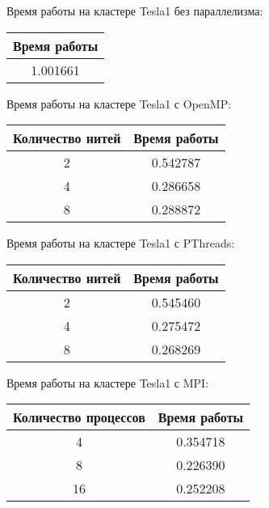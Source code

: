 \documentclass[12pt]{article}
\begin{document}
\bigskip
\bigskip
\bigskip

Время работы на кластере Tesla1 без параллелизма:
\begin{center}
    \begin{tabular}{c}
      \hline
      Время работы  \\
      \hline
      1.001661 \\
      \hline
    \end{tabular}
\end{center}

Время работы на кластере Tesla1 с OpenMP:
\begin{center}
    \begin{tabular}{c|c}
     \hline
      Количество нитей & Время работы  \\
      \hline
      2 & 0.542787 \\
      \hline
      4 & 0.286658 \\
      \hline
      8 &  0.288872 \\
      \hline
    \end{tabular}
\end{center}

\newpage

Время работы на кластере Tesla1 с PThreads:
\begin{center}
    \begin{tabular}{c|c}
     \hline
      Количество нитей & Время работы  \\
      \hline
      2 & 0.545460 \\
      \hline
      4 & 0.275472 \\
      \hline
      8 &  0.268269 \\
      \hline
    \end{tabular}
\end{center}

Время работы на кластере Tesla1 с MPI:
\begin{center}
    \begin{tabular}{c|c}
     \hline
      Количество процессов & Время работы  \\
      \hline
      4 & 0.354718 \\
      \hline
      8 & 0.226390 \\
      \hline
      16 &  0.252208 \\
      \hline
    \end{tabular}
\end{center}
\end{document}
